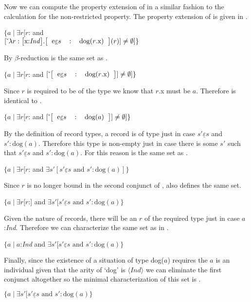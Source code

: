 Now we can compute the property extension of
 in a similar fashion to the calculation for the
non-restricted property.   
The property extension of  is given in \nexteg{}.\label{pg:set-reduction-gq}
\begin{ex} 
$\{a\mid\exists
  r[r$: and \\
\hspace*{2em}$\down{\lambda
  r:\text{\smallrecord{\smalltfield{x}{\textit{Ind}}}}
  . \text{\record{\rfield{e}{$s$}{dog($r$.x)}}}(r)} \not=\emptyset]\}$ 
\end{ex} 
By $\beta$-reduction \preveg{} is the same set as \nexteg{}.
\begin{ex} 
$\{a\mid\exists
  r[r$: and 
$\down{\text{\record{\rfield{e}{$s$}{dog($r$.x)}}}} \not=\emptyset]\}$  
\end{ex} 
Since $r$ is required to be of the type
 we know that $r$.x
must be $a$.  Therefore \preveg{} is identical to \nexteg{}.
\begin{ex} 
$\{a\mid\exists
  r[r$: and 
$\down{\text{\record{\rfield{e}{$s$}{dog($a$)}}}} \not=\emptyset]\}$ 
\end{ex} 
By the definition of record types, a record
 is of type
 just in case $s'\underline{\varepsilon}s$ and
$s':\text{dog}(a)$.
Therefore this type is non-empty just in case there is some $s'$ such
that $s'\underline{\varepsilon}s$ and $s':\text{dog}(a)$.
For this reason \preveg{} is the same set as \nexteg{}.
\begin{ex} 
$\{a\mid\exists
  r[r$: and 
$\exists s'[s'\underline{\varepsilon}s \text{ and } s':\text{dog}(a)]\}$ 
\end{ex}
Since $r$ is no longer bound in the second conjunct of \preveg{},
\nexteg{} also defines the same set.
\begin{ex} 
$\{a\mid\exists
  r[r$:] and 
$\exists s'[s'\underline{\varepsilon}s \text{ and } s':\text{dog}(a)\}$ 
\end{ex} 
Given the nature of records, there will be an $r$ of the required type
just in case $a$:\textit{Ind}.  Therefore we can characterize the same set
as in \nexteg{}.
\begin{ex} 
$\{a\mid a$:\textit{Ind} and 
$\exists s'[s'\underline{\varepsilon}s \text{ and } s':\text{dog}(a)\}$ 
\end{ex} 
Finally, since the existence of a situation of type dog($a$) requires
the $a$ is an individual given that the arity of `dog' is
$\langle\textit{Ind}\rangle$ we can eliminate the first conjunct
altogether so the minimal characterization of this set is \nexteg{}.
\begin{ex} 
$\{a\mid  
\exists s'[s'\underline{\varepsilon}s \text{ and } s':\text{dog}(a)\}$  
\end{ex} 

